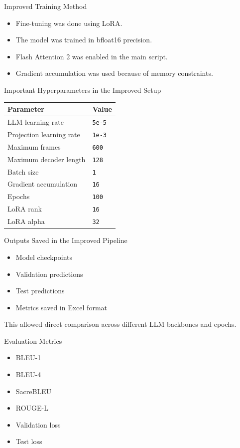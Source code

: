\documentclass[aspectratio=169]{beamer}
\begin{document}
\begin{frame}{Improved Training Method}
\begin{itemize}
  \item Fine-tuning was done using LoRA.
  \item The model was trained in bfloat16 precision.
  \item Flash Attention 2 was enabled in the main script.
  \item Gradient accumulation was used because of memory constraints.
\end{itemize}
\end{frame}

\begin{frame}{Important Hyperparameters in the Improved Setup}
\begin{table}
\centering
\small
\begin{tabular}{ll}
\toprule
Parameter & Value \\
\midrule
LLM learning rate & \texttt{5e-5} \\
Projection learning rate & \texttt{1e-3} \\
Maximum frames & \texttt{600} \\
Maximum decoder length & \texttt{128} \\
Batch size & \texttt{1} \\
Gradient accumulation & \texttt{16} \\
Epochs & \texttt{100} \\
LoRA rank & \texttt{16} \\
LoRA alpha & \texttt{32} \\
\bottomrule
\end{tabular}
\end{table}
\end{frame}

\begin{frame}{Outputs Saved in the Improved Pipeline}
\begin{itemize}
  \item Model checkpoints
  \item Validation predictions
  \item Test predictions
  \item Metrics saved in Excel format
\end{itemize}
\vspace{0.5em}
This allowed direct comparison across different LLM backbones and epochs.
\end{frame}

\begin{frame}{Evaluation Metrics}
\begin{itemize}
  \item BLEU-1
  \item BLEU-4
  \item SacreBLEU
  \item ROUGE-L
  \item Validation loss
  \item Test loss
\end{itemize}
\end{frame}
\end{document}
